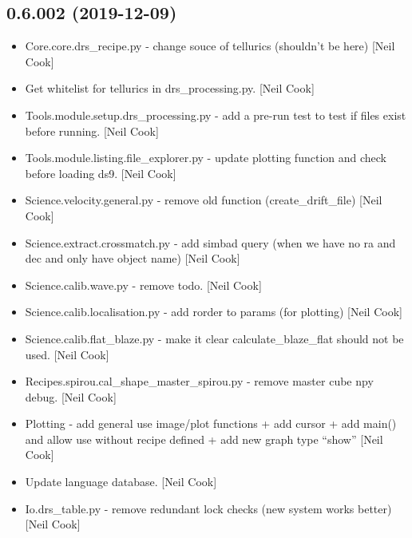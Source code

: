 \documentclass[a4paper,10pt,english]{report}
\begin{document}
\subsection{0.6.002 (2019-12-09)}
\label{\detokenize{misc/changelog:id15}}\begin{itemize}
\item {} 
Core.core.drs\_recipe.py - change souce of tellurics (shouldn’t be
here) {[}Neil Cook{]}

\item {} 
Get whitelist for tellurics in drs\_processing.py. {[}Neil Cook{]}

\item {} 
Tools.module.setup.drs\_processing.py - add a pre-run test to test if
files exist before running. {[}Neil Cook{]}

\item {} 
Tools.module.listing.file\_explorer.py - update plotting function and
check before loading ds9. {[}Neil Cook{]}

\item {} 
Science.velocity.general.py - remove old function (create\_drift\_file)
{[}Neil Cook{]}

\item {} 
Science.extract.crossmatch.py - add simbad query (when we have no ra
and dec and only have object name) {[}Neil Cook{]}

\item {} 
Science.calib.wave.py - remove todo. {[}Neil Cook{]}

\item {} 
Science.calib.localisation.py - add rorder to params (for plotting)
{[}Neil Cook{]}

\item {} 
Science.calib.flat\_blaze.py - make it clear calculate\_blaze\_flat
should not be used. {[}Neil Cook{]}

\item {} 
Recipes.spirou.cal\_shape\_master\_spirou.py - remove master cube npy
debug. {[}Neil Cook{]}

\item {} 
Plotting - add general use image/plot functions + add cursor + add
main() and allow use without recipe defined + add new graph type
“show” {[}Neil Cook{]}

\item {} 
Update language database. {[}Neil Cook{]}

\item {} 
Io.drs\_table.py - remove redundant lock checks (new system works
better) {[}Neil Cook{]}


\end{itemize}
\end{document}
